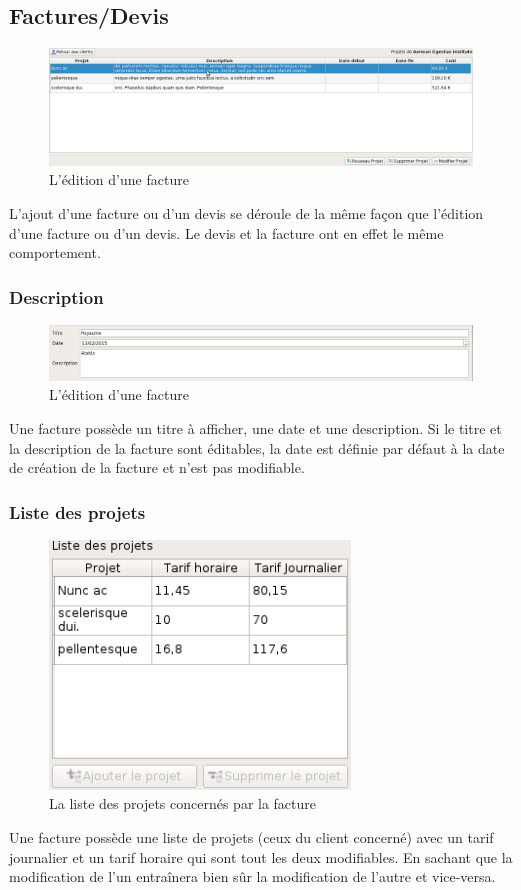 \subsection{Factures/Devis}
\begin{figure}[H]
	\centering
	\includegraphics[width=17cm]{screens/projets.png}
	\caption{L'édition d'une facture}
	\label{fig:edit_fact}
\end{figure}
L'ajout d'une facture ou d'un devis se déroule de la même façon que l'édition d'une facture ou d'un devis. Le devis et la facture ont en effet le même comportement.

\subsubsection{Description}
\begin{figure}[H]
	\centering
	\includegraphics[width=17cm]{screens/description.png}
	\caption{L'édition d'une facture}
	\label{fig:description_fact}
\end{figure}
Une facture possède un titre à afficher, une date et une description. Si le titre et la description de la facture sont éditables, la date est définie par défaut à la date de création de la facture et n'est pas modifiable.

\subsubsection{Liste des projets}
\begin{figure}[H]
	\centering
	\includegraphics[width=8cm]{screens/listeProjets.png}
	\caption{La liste des projets concernés par la facture}
	\label{fig:project_list_bill}
\end{figure}
Une facture possède une liste de projets (ceux du client concerné) avec un tarif journalier et un tarif horaire qui sont tout les deux modifiables. En sachant que la modification de l'un entraînera bien sûr la modification de l'autre et vice-versa.

